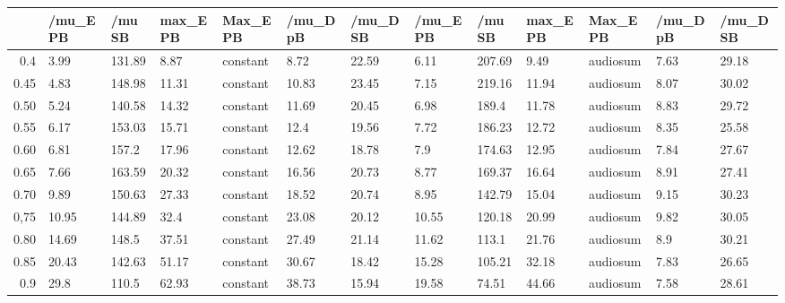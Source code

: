 \begin{table}[ht]
\centering
\begin{tabular}{rllllllllllll}
  \hline
 & /mu\_E PB & /mu SB & max\_E PB & Max\_E PB & /mu\_D pB & /mu\_D SB & /mu\_E PB & /mu SB & max\_E PB & Max\_E PB & /mu\_D pB & /mu\_D SB \\ 
  \hline
0.4 & 3.99 & 131.89 & 8.87 & constant & 8.72 & 22.59 & 6.11 & 207.69 & 9.49 & audiosum & 7.63 & 29.18 \\ 
  0.45 & 4.83 & 148.98 & 11.31 & constant & 10.83 & 23.45 & 7.15 & 219.16 & 11.94 & audiosum & 8.07 & 30.02 \\ 
  0.50 & 5.24 & 140.58 & 14.32 & constant & 11.69 & 20.45 & 6.98 & 189.4 & 11.78 & audiosum & 8.83 & 29.72 \\ 
  0.55 & 6.17 & 153.03 & 15.71 & constant & 12.4 & 19.56 & 7.72 & 186.23 & 12.72 & audiosum & 8.35 & 25.58 \\ 
  0.60 & 6.81 & 157.2 & 17.96 & constant & 12.62 & 18.78 & 7.9 & 174.63 & 12.95 & audiosum & 7.84 & 27.67 \\ 
  0.65 & 7.66 & 163.59 & 20.32 & constant & 16.56 & 20.73 & 8.77 & 169.37 & 16.64 & audiosum & 8.91 & 27.41 \\ 
  0.70 & 9.89 & 150.63 & 27.33 & constant & 18.52 & 20.74 & 8.95 & 142.79 & 15.04 & audiosum & 9.15 & 30.23 \\ 
  0,75 & 10.95 & 144.89 & 32.4 & constant & 23.08 & 20.12 & 10.55 & 120.18 & 20.99 & audiosum & 9.82 & 30.05 \\ 
  0.80 & 14.69 & 148.5 & 37.51 & constant & 27.49 & 21.14 & 11.62 & 113.1 & 21.76 & audiosum & 8.9 & 30.21 \\ 
  0.85 & 20.43 & 142.63 & 51.17 & constant & 30.67 & 18.42 & 15.28 & 105.21 & 32.18 & audiosum & 7.83 & 26.65 \\ 
  0.9 & 29.8 & 110.5 & 62.93 & constant & 38.73 & 15.94 & 19.58 & 74.51 & 44.66 & audiosum & 7.58 & 28.61 \\ 
   \hline
\end{tabular}
\end{table}
